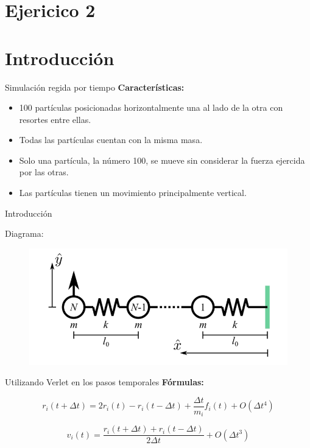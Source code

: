 \section{Ejericico 2}\label{sec:ejer2}


\section{Introducción}\label{sec:introduccion}
\begin{frame}{Simulación regida por tiempo}
    \textbf{Características:}
    \begin{itemize}
        \item 100 partículas posicionadas horizontalmente una al lado de la otra con resortes entre ellas.
        \item Todas las partículas cuentan con la misma masa.
        \item Solo una partícula, la número 100, se mueve sin considerar la fuerza ejercida por las otras.
        \item Las partículas tienen un movimiento principalmente vertical.
    \end{itemize}
\end{frame}

\begin{frame}{Introducción}
    \begin{block}{Diagrama:}
        \begin{figure}
            \centering
            \includegraphics[width=0.8\linewidth]{pic/01-introduccion/diagrama}
            \label{fig:diagrama}
        \end{figure}
    \end{block}
\end{frame}

\begin{frame}{Utilizando Verlet en los pasos temporales}
    \textbf{Fórmulas:}

    \vspace{5pt}
    \begin{equation*}
        r_i(t + \Delta{t}) = 2 r_i(t) - r_i(t-\Delta{t}) + \frac{\Delta{t}}{m_i} f_i(t) + O(\Delta{t}^4)
    \end{equation*}
    
    \vspace{20pt}
    \begin{equation*}
        v_i(t) = \frac{r_i(t+\Delta{t}) + r_i(t-\Delta{t})}{2\Delta{t}} + O(\Delta{t}^3)
    \end{equation*}
\end{frame}


